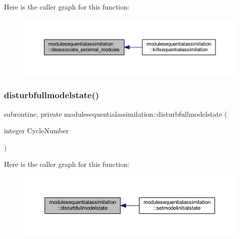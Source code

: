 Here is the caller graph for this function\+:\nopagebreak
\begin{figure}[H]
\begin{center}
\leavevmode
\includegraphics[width=350pt]{namespacemodulesequentialassimilation_adf87f0a5e3f8680e6eab41ee6c53dd51_icgraph}
\end{center}
\end{figure}
\mbox{\label{namespacemodulesequentialassimilation_a30f7a4267c0bcf30928733c782104389}} 
\subsubsection{\texorpdfstring{disturbfullmodelstate()}{disturbfullmodelstate()}}
{\footnotesize\ttfamily subroutine, private modulesequentialassimilation\+::disturbfullmodelstate (\begin{DoxyParamCaption}\item[{integer}]{Cycle\+Number }\end{DoxyParamCaption})\hspace{0.3cm}{\ttfamily [private]}}

Here is the caller graph for this function\+:\nopagebreak
\begin{figure}[H]
\begin{center}
\leavevmode
\includegraphics[width=350pt]{namespacemodulesequentialassimilation_a30f7a4267c0bcf30928733c782104389_icgraph}
\end{center}
\end{figure}
\mbox{\label{namespacemodulesequentialassimilation_a4f7834d6d8d5c26c37c74e758a14b521}} 
